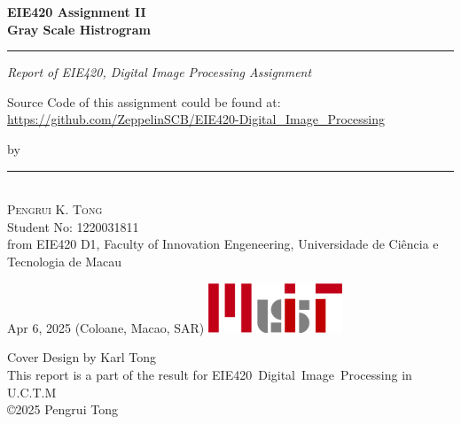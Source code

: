 \begin{titlepage}
    \ActivateWarningFilters[latex]

    \parbox{1\textwidth}{ %
		{\Huge\bfseries EIE420 Assignment II \\[0.15\baselineskip] 
        Gray Scale Histrogram}\\[0.15\baselineskip] %
		\rule{1\textwidth}{1pt} %
        {\Large\textit{Report of EIE420, Digital Image Processing Assignment}}
        \newline
    }
    \parbox{1\textwidth}{
        \vspace{1\baselineskip}
        \large
        Source Code of this assignment could be found at:\newline
        \url{https://github.com/ZeppelinSCB/EIE420-Digital_Image_Processing}
        \newline
    }
    \vspace{100pt} %
    \parbox{1\textwidth}{
        {\large by}\\[1.5\baselineskip]
        {\rule[1pt]{200pt}{1pt}} \\[1.25pt]
        {\huge\textsc{Pengrui K. Tong}
            }\\
        {\large{Student No: 1220031811}} \\
        \large from EIE420 D1, \newline
        Faculty of Innovation Engeneering, \newline
        Universidade de Ciência e Tecnologia de Macau
    }
		

    \vspace*{\fill}
		Apr 6, 2025 \newline 
        (Coloane, Macao, SAR)
        \vspace{0.7\baselineskip}\newline
        \includegraphics[width = 40mm]{../Header/MUIT_origin.png}\par
        {\small Cover Design by Karl Tong}\\[0.25pt]
        {\small This report is a part of the result for}
        {\small EIE420~Digital~Image~Processing in U.C.T.M}\\[0.25pt]
        {\small \copyright 2025 Pengrui Tong}
\end{titlepage}